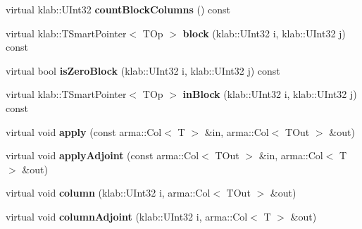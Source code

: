 \begin{DoxyCompactItemize}
\item 
virtual klab\+::\+U\+Int32 {\bfseries count\+Block\+Columns} () const \hypertarget{classkl1p_1_1TBlockDiagonalOperator_ab5f650485e832010c3bf066e81f7b51c}{}\label{classkl1p_1_1TBlockDiagonalOperator_ab5f650485e832010c3bf066e81f7b51c}

\item 
virtual klab\+::\+T\+Smart\+Pointer$<$ T\+Op $>$ {\bfseries block} (klab\+::\+U\+Int32 i, klab\+::\+U\+Int32 j) const \hypertarget{classkl1p_1_1TBlockDiagonalOperator_ad2faf788f1e5d6582016a01abcd6f421}{}\label{classkl1p_1_1TBlockDiagonalOperator_ad2faf788f1e5d6582016a01abcd6f421}

\item 
virtual bool {\bfseries is\+Zero\+Block} (klab\+::\+U\+Int32 i, klab\+::\+U\+Int32 j) const \hypertarget{classkl1p_1_1TBlockDiagonalOperator_ab87734c38b99e8fdee34a8d470b6a9e0}{}\label{classkl1p_1_1TBlockDiagonalOperator_ab87734c38b99e8fdee34a8d470b6a9e0}

\item 
virtual klab\+::\+T\+Smart\+Pointer$<$ T\+Op $>$ {\bfseries in\+Block} (klab\+::\+U\+Int32 i, klab\+::\+U\+Int32 j) const \hypertarget{classkl1p_1_1TBlockDiagonalOperator_a706f7630da22dfea218065259e215d38}{}\label{classkl1p_1_1TBlockDiagonalOperator_a706f7630da22dfea218065259e215d38}

\item 
virtual void {\bfseries apply} (const arma\+::\+Col$<$ T $>$ \&in, arma\+::\+Col$<$ T\+Out $>$ \&out)\hypertarget{classkl1p_1_1TBlockDiagonalOperator_a3f34f696160cf9818dfb86a04bfd4c41}{}\label{classkl1p_1_1TBlockDiagonalOperator_a3f34f696160cf9818dfb86a04bfd4c41}

\item 
virtual void {\bfseries apply\+Adjoint} (const arma\+::\+Col$<$ T\+Out $>$ \&in, arma\+::\+Col$<$ T $>$ \&out)\hypertarget{classkl1p_1_1TBlockDiagonalOperator_acf69f8652502cdabcbf4aa56f3ac9262}{}\label{classkl1p_1_1TBlockDiagonalOperator_acf69f8652502cdabcbf4aa56f3ac9262}

\item 
virtual void {\bfseries column} (klab\+::\+U\+Int32 i, arma\+::\+Col$<$ T\+Out $>$ \&out)\hypertarget{classkl1p_1_1TBlockDiagonalOperator_a7281190bf92d50ea8261874d426a39eb}{}\label{classkl1p_1_1TBlockDiagonalOperator_a7281190bf92d50ea8261874d426a39eb}

\item 
virtual void {\bfseries column\+Adjoint} (klab\+::\+U\+Int32 i, arma\+::\+Col$<$ T $>$ \&out)\hypertarget{classkl1p_1_1TBlockDiagonalOperator_a37b1264646d5cfb5a3981e176be44d14}{}\label{classkl1p_1_1TBlockDiagonalOperator_a37b1264646d5cfb5a3981e176be44d14}


\end{DoxyCompactItemize}
